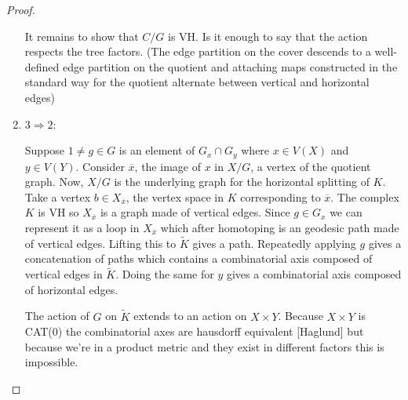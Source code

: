 \documentclass{article}
\theoremstyle{mystyle}
\theoremstyle{remark}
\begin{document}
\begin{proof}
\begin{enumerate}
    It remains to show that $C/G$ is VH. Is it enough to say that the action respects the tree factors. (The edge partition on the cover descends to a well-defined edge partition on the quotient and attaching maps constructed in the standard way for the quotient alternate between vertical and horizontal edges)
    
\item $3\Rightarrow 2$: 
    

    Suppose $1\neq g \in G$ is an element of $G_x\cap G_y$ where $x \in V(X)$ and $y\in V(Y)$. Consider $\overline{x}$, the image of $x$ in $X/G$, a vertex of the quotient graph. Now, $X/G$ is the underlying graph for the horizontal splitting of $K$. Take a vertex $b \in X_{\overline{x}}$, the vertex space in $K$ corresponding to $\overline{x}$. The complex $K$ is VH so $X_\overline{x}$ is a graph made of vertical edges. Since $g\in G_x$ we can represent it as a loop in $X_{\overline{x}}$  which after homotoping is an geodesic path made of vertical edges. Lifting this to $\widetilde{K}$ gives a path. Repeatedly applying $g$ gives a concatenation of paths which contains a combinatorial axis composed of vertical edges in $\widetilde{K}$. Doing the same for $y$ gives a combinatorial axis composed of horizontal edges. 
    
    The action of $G$ on $\widetilde{K}$ extends to an action on $X \times Y$. Because $X\times Y$ is CAT(0) the combinatorial axes are hausdorff equivalent [Haglund] but because we're in a product metric and they exist in different factors this is impossible.
    
\end{enumerate}
\end{proof}
\end{document}
